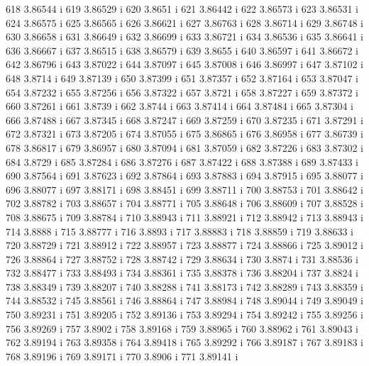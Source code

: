  618  3.86544  i
 619  3.86529  i
 620  3.8651  i
 621  3.86442  i
 622  3.86573  i
 623  3.86531  i
 624  3.86575  i
 625  3.86565  i
 626  3.86621  i
 627  3.86763  i
 628  3.86714  i
 629  3.86748  i
 630  3.86658  i
 631  3.86649  i
 632  3.86699  i
 633  3.86721  i
 634  3.86536  i
 635  3.86641  i
 636  3.86667  i
 637  3.86515  i
 638  3.86579  i
 639  3.8655  i
 640  3.86597  i
 641  3.86672  i
 642  3.86796  i
 643  3.87022  i
 644  3.87097  i
 645  3.87008  i
 646  3.86997  i
 647  3.87102  i
 648  3.8714  i
 649  3.87139  i
 650  3.87399  i
 651  3.87357  i
 652  3.87164  i
 653  3.87047  i
 654  3.87232  i
 655  3.87256  i
 656  3.87322  i
 657  3.8721  i
 658  3.87227  i
 659  3.87372  i
 660  3.87261  i
 661  3.8739  i
 662  3.8744  i
 663  3.87414  i
 664  3.87484  i
 665  3.87304  i
 666  3.87488  i
 667  3.87345  i
 668  3.87247  i
 669  3.87259  i
 670  3.87235  i
 671  3.87291  i
 672  3.87321  i
 673  3.87205  i
 674  3.87055  i
 675  3.86865  i
 676  3.86958  i
 677  3.86739  i
 678  3.86817  i
 679  3.86957  i
 680  3.87094  i
 681  3.87059  i
 682  3.87226  i
 683  3.87302  i
 684  3.8729  i
 685  3.87284  i
 686  3.87276  i
 687  3.87422  i
 688  3.87388  i
 689  3.87433  i
 690  3.87564  i
 691  3.87623  i
 692  3.87864  i
 693  3.87883  i
 694  3.87915  i
 695  3.88077  i
 696  3.88077  i
 697  3.88171  i
 698  3.88451  i
 699  3.88711  i
 700  3.88753  i
 701  3.88642  i
 702  3.88782  i
 703  3.88657  i
 704  3.88771  i
 705  3.88648  i
 706  3.88609  i
 707  3.88528  i
 708  3.88675  i
 709  3.88784  i
 710  3.88943  i
 711  3.88921  i
 712  3.88942  i
 713  3.88943  i
 714  3.8888  i
 715  3.88777  i
 716  3.8893  i
 717  3.88883  i
 718  3.88859  i
 719  3.88633  i
 720  3.88729  i
 721  3.88912  i
 722  3.88957  i
 723  3.88877  i
 724  3.88866  i
 725  3.89012  i
 726  3.88864  i
 727  3.88752  i
 728  3.88742  i
 729  3.88634  i
 730  3.8874  i
 731  3.88536  i
 732  3.88477  i
 733  3.88493  i
 734  3.88361  i
 735  3.88378  i
 736  3.88204  i
 737  3.8824  i
 738  3.88349  i
 739  3.88207  i
 740  3.88288  i
 741  3.88173  i
 742  3.88289  i
 743  3.88359  i
 744  3.88532  i
 745  3.88561  i
 746  3.88864  i
 747  3.88984  i
 748  3.89044  i
 749  3.89049  i
 750  3.89231  i
 751  3.89205  i
 752  3.89136  i
 753  3.89294  i
 754  3.89242  i
 755  3.89256  i
 756  3.89269  i
 757  3.8902  i
 758  3.89168  i
 759  3.88965  i
 760  3.88962  i
 761  3.89043  i
 762  3.89194  i
 763  3.89358  i
 764  3.89418  i
 765  3.89292  i
 766  3.89187  i
 767  3.89183  i
 768  3.89196  i
 769  3.89171  i
 770  3.8906  i
 771  3.89141  i
